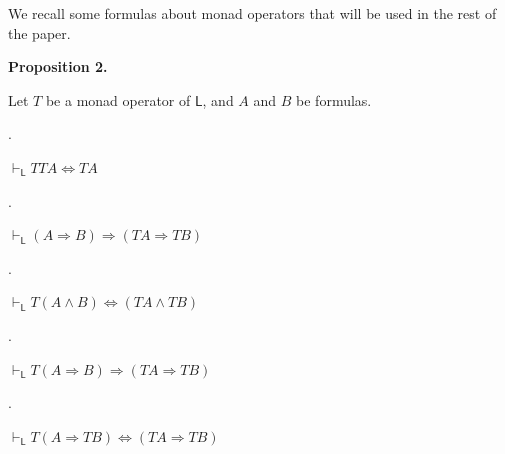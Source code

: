  
  
 
 
 
We recall some formulas about monad operators that will be used in the rest of the paper.\par
 
 
 
\par\medskip\noindent\textbf{Proposition 2.}\par
 
 
Let $T$ be a monad operator of $\mathsf{L}$, and $A$ and $B$ be formulas.\par
  
\par{}. 
 
$\vdash_{\mathsf{L}}TTA\Leftrightarrow TA$\par
 
 
 
\par{}. 
 
$\vdash_{\mathsf{L}}(A\mathbin{\Rightarrow}B)\mathbin{\Rightarrow}(TA\mathbin{\Rightarrow}TB)$\par
 
 
 
\par{}. 
 
$\vdash_{\mathsf{L}}T(A\mathbin{\wedge}B)\Leftrightarrow(TA\mathbin{\wedge}TB)$\par
 
 
 
\par{}. 
 
$\vdash_{\mathsf{L}}T(A\mathbin{\Rightarrow}B)\mathbin{\Rightarrow}(TA\mathbin{\Rightarrow}TB)$\par
 
 
 
\par{}. 
 
$\vdash_{\mathsf{L}}T(A\mathbin{\Rightarrow}TB)\Leftrightarrow(TA\mathbin{\Rightarrow}TB)$\par
 
